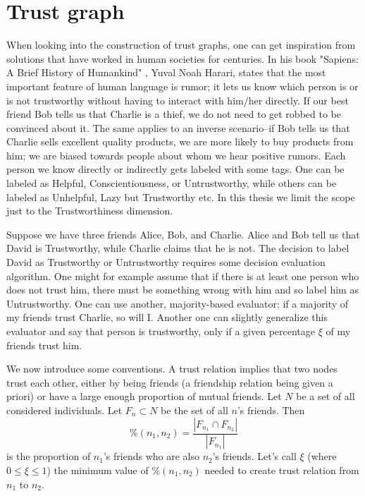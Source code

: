 \chapter{Trust graph}
\label{trust-graph}

When looking into the construction of trust graphs, one can get inspiration from solutions that have worked in human societies for centuries.
In his book "Sapiens: A Brief History of Humankind" \cite{harari2014sapiens}, Yuval Noah Harari, states that the most important feature of human language is rumor; it lets us know which person is or is not trustworthy without having to interact with him/her directly. If our best friend Bob tells us that Charlie is a thief, we do not need to get robbed to be convinced about it. The same applies to an inverse scenario--if Bob tells us that Charlie sells excellent quality products, we are more likely to buy products from him; we are biased towards people about whom we hear positive rumors. Each person we know directly or indirectly gets labeled with some tags. One can be labeled as Helpful, Conscientiousness, or Untrustworthy, while others can be labeled as Unhelpful, Lazy but Trustworthy etc. In this thesis we  limit the scope just to the Trustworthiness dimension.

Suppose we have three friends Alice, Bob, and Charlie. Alice and Bob tell us that David is Trustworthy, while Charlie claims that he is not. The decision to label David as Trustworthy or Untrustworthy requires some decision evaluation algorithm.
One might for example assume that if there is at least one person who does not trust him, there must be something wrong with him and so label him as Untrustworthy. One can use another, majority-based evaluator: if a majority of my friends trust Charlie, so will I. Another one can slightly generalize this evaluator and say that person is trustworthy, only if a given percentage $\xi$ of my friends trust him. 

We now introduce some conventions. A trust relation implies that two nodes trust each other, either by being friends (a friendship relation being given a priori) or have a large enough proportion of mutual friends. 
Let $N$ be a set of all considered individuals. Let $F_n \subset N$ be the set of all $n$'s friends. Then 
\begin{equation}
\%(n_1, n_2) = \frac{|F_{n_1} \cap F_{n_2}|}{|F_{n_1}|}    
\end{equation}
is the proportion of $n_1$'s friends who are also $n_2$'s friends. Let's call $\xi$ (where $0 \le \xi \leq 1$) the minimum value of $\%(n_1, n_2)$ needed to create trust relation from $n_1$ to $n_2$.

